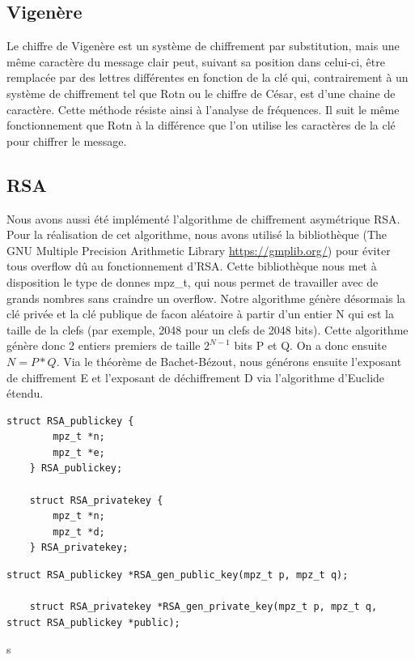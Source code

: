         \subsection{Vigenère}
            Le chiffre de Vigenère est un système de chiffrement par substitution, mais une même caractère du message clair peut, suivant sa position dans celui-ci, être remplacée par des lettres différentes en fonction de la clé qui, contrairement à un système de chiffrement tel que Rotn ou le chiffre de César, est d’une chaine de caractère. Cette méthode résiste ainsi à l'analyse de fréquences. Il suit le même fonctionnement que Rotn à la différence que l’on utilise les caractères de la clé pour chiffrer le message. \\
        
        \newpage

        \subsection{RSA}
        Nous avons aussi été implémenté l’algorithme de chiffrement asymétrique RSA. Pour la réalisation de cet algorithme, nous avons utilisé la bibliothèque (The GNU Multiple Precision Arithmetic Library \url{https://gmplib.org/}) pour éviter tous overflow dû au fonctionnement d’RSA. Cette bibliothèque nous met à disposition le type de donnes mpz\_t, qui nous permet de travailler avec de grands nombres sans craindre un overflow.
        Notre algorithme génère désormais la clé privée et la clé publique de facon aléatoire à partir d'un entier N qui est la taille de la clefs (par exemple, 2048 pour un clefs de 2048 bits). Cette algorithme génère donc 2 entiers premiers de taille $2^{N-1}$ bits P et Q. On a donc ensuite $N = P * Q$.
        Via le théorème de Bachet-Bézout, nous générons ensuite l'exposant de chiffrement E et l'exposant de déchiffrement D via l'algorithme d'Euclide étendu.

        \begin{lstlisting}[style=CStyle]
    struct RSA_publickey {
        mpz_t *n;
        mpz_t *e;
    } RSA_publickey;
    
    struct RSA_privatekey {
        mpz_t *n;
        mpz_t *d;
    } RSA_privatekey;
		\end{lstlisting}	
		
       \begin{lstlisting}[style=CStyle]
    struct RSA_publickey *RSA_gen_public_key(mpz_t p, mpz_t q);
    
    struct RSA_privatekey *RSA_gen_private_key(mpz_t p, mpz_t q, struct RSA_publickey *public);
		\end{lstlisting}s

